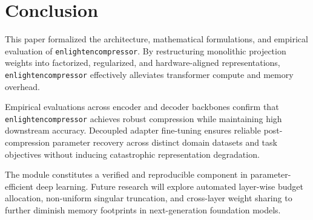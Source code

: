 \section{Conclusion}
This paper formalized the architecture, mathematical formulations, and empirical evaluation of \texttt{enlightencompressor}. By restructuring monolithic projection weights into factorized, regularized, and hardware-aligned representations, \texttt{enlightencompressor} effectively alleviates transformer compute and memory overhead.

Empirical evaluations across encoder and decoder backbones confirm that \texttt{enlightencompressor} achieves robust compression while maintaining high downstream accuracy. Decoupled adapter fine-tuning ensures reliable post-compression parameter recovery across distinct domain datasets and task objectives without inducing catastrophic representation degradation.

The module constitutes a verified and reproducible component in parameter-efficient deep learning. Future research will explore automated layer-wise budget allocation, non-uniform singular truncation, and cross-layer weight sharing to further diminish memory footprints in next-generation foundation models.
